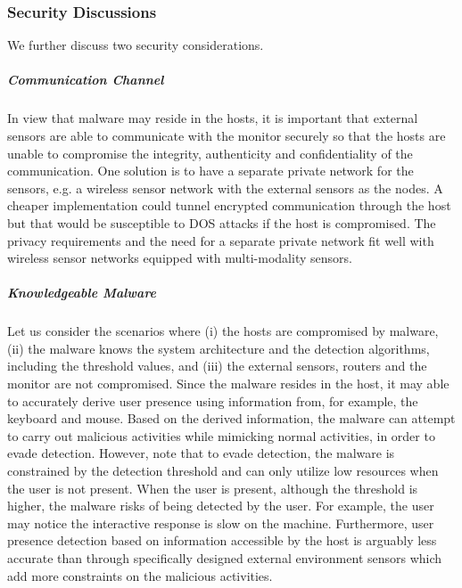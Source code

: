 %

\subsubsection{Security Discussions}

We further discuss two security considerations.

\subparagraph{Communication Channel}

In view that malware may reside in the hosts,
it is important that external sensors are able to communicate with
the monitor securely so that the hosts are unable to compromise
the integrity, authenticity and confidentiality of the communication.
One solution is to have a separate private network for the sensors,
e.g. a wireless sensor network with the external sensors as the nodes.
A cheaper implementation could tunnel encrypted communication
through the host but that would be susceptible to DOS attacks if
the host is compromised.
The privacy requirements and the need for a separate private
network fit well with wireless sensor networks equipped with
multi-modality sensors.

\subparagraph{Knowledgeable Malware}

Let us consider the scenarios where
(i) the hosts are compromised by malware,
(ii) the malware knows the system architecture and the detection algorithms,
including the threshold values, and
(iii) the external sensors, routers and the monitor are not compromised.
Since the malware resides in the host, it may able
to accurately derive user presence using information from, for example,
the keyboard and mouse.
Based on the derived information, the malware can attempt
to carry out malicious activities while mimicking normal activities, in order
to evade detection.
However, note that to evade detection, the malware is
constrained by the detection threshold and can only utilize low resources when
the user is not present.
When the user is present, although the threshold is
higher, the malware risks of being detected by the user.
For example, the
user may notice the interactive response is slow on the machine.
Furthermore, user presence detection based on information accessible 
by the host is arguably less accurate than through specifically 
designed external environment
sensors which add more constraints on the malicious activities.
